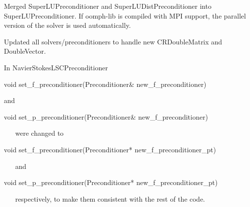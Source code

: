 \begin{DoxyItemize}
\item Merged {\ttfamily Super\+L\+U\+Preconditioner} and {\ttfamily Super\+L\+U\+Dist\+Preconditioner} into {\ttfamily Super\+L\+U\+Preconditioner}. If {\ttfamily oomph-\/lib} is compiled with M\+PI support, the parallel version of the solver is used automatically. ~\newline
~\newline

\item Updated all solvers/preconditioners to handle new {\ttfamily C\+R\+Double\+Matrix} and {\ttfamily Double\+Vector}. ~\newline
~\newline

\item In {\ttfamily Navier\+Stokes\+L\+S\+C\+Preconditioner} ~\newline
~\newline

\begin{DoxyCode}
\textcolor{keywordtype}{void} set\_f\_preconditioner(Preconditioner& new\_f\_preconditioner)
\end{DoxyCode}
 and ~\newline
~\newline

\begin{DoxyCode}
\textcolor{keywordtype}{void} set\_p\_preconditioner(Preconditioner& new\_f\_preconditioner)
\end{DoxyCode}
 ~\newline
~\newline
 were changed to ~\newline
~\newline

\begin{DoxyCode}
\textcolor{keywordtype}{void} set\_f\_preconditioner(Preconditioner* new\_f\_preconditioner\_pt)
\end{DoxyCode}
 ~\newline
~\newline
 and ~\newline
~\newline

\begin{DoxyCode}
\textcolor{keywordtype}{void} set\_p\_preconditioner(Preconditioner* new\_f\_preconditioner\_pt)
\end{DoxyCode}
 ~\newline
~\newline
 respectively, to make them consistent with the rest of the code. ~\newline
~\newline


\end{DoxyItemize}
